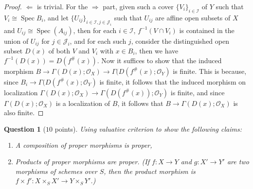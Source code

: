 \documentclass[12pt]{amsart}
\newcommand{\spec}{\operatorname{Spec}}
\newtheorem{question}{Question}
\begin{document}
\begin{proof}
	$\Leftarrow $ is trivial. For the $\Rightarrow $ part, given such a cover $\{V_i\}_{i\in\mathcal{I} } $ of $Y$ such that $V_i\cong\spec B_i $, and let $\{U_{ij}\}_{i\in\mathcal{I} ,j\in\mathcal{J}_i } $ such that $U_{ij} $ are affine open subsets of $X$ and $U_{ij}\cong\spec (A_{ij} )$, then for each $i\in\mathcal{I} $, $f^{-1} (V\cap V_i )$ is contained in the union of $U_{ij} $ for $j\in\mathcal{J}_i $, and for each such $j$, consider the distinguished open subset $D(x)$ of both $V$ and $V_i $ with $x\in B_i $, then we have $f^{-1} (D(x))=D(f^{\# } (x))$. Now it suffices to show that the induced morphism $B\to\Gamma (D(x);\mathcal{O}_X )\to\Gamma (D(f^{\# } (x);\mathcal{O}_Y )$ is finite. This is because, since $B_i\to\Gamma (D(f^{\# } (x);\mathcal{O}_Y ) $ is finite, it follows that the induced morphism on localization $\Gamma (D(x);\mathcal{O}_X )\to\Gamma (D(f^{\# } (x));\mathcal{O}_Y )$ is finite, and since $\Gamma (D(x);\mathcal{O}_X )$ is a localization of $B$, it follows that $B\to\Gamma (D(x);\mathcal{O}_X )$ is also finite.
\end{proof}

\begin{question}[$10$ points]
Using valuative criterion to show the following claims:
\begin{enumerate}
\item A composition of proper morphisms is proper,
\item Products of proper morphisms are proper.
(If $f: X \to Y$ and $g: X' \to Y'$ are two morphisms of schemes over $S$, then the product morphism is $f \times f': X \times_S X' \to Y \times_S Y'$.)
\end{enumerate}

\end{question}
\end{document}
